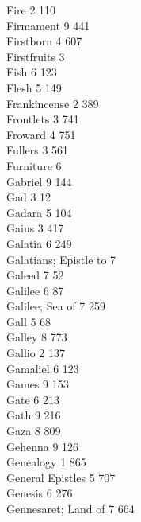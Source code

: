 Fire \hfill 2 \quad \phantom{0}110\\
Firmament \hfill 9 \quad \phantom{0}441\\
Firstborn \hfill 4 \quad \phantom{0}607\\
Firstfruits \hfill 3 \\
Fish \hfill 6 \quad \phantom{0}123\\
Flesh \hfill 5 \quad \phantom{0}149\\
Frankincense \hfill 2 \quad \phantom{0}389\\
Frontlets \hfill 3 \quad \phantom{0}741\\
Froward \hfill 4 \quad \phantom{0}751\\
Fullers \hfill 3 \quad \phantom{0}561\\
Furniture \hfill 6 \\
Gabriel \hfill 9 \quad \phantom{0}144\\
Gad \hfill 3 \quad \phantom{0}\phantom{0}12\\
Gadara \hfill 5 \quad \phantom{0}104\\
Gaius \hfill 3 \quad \phantom{0}417\\
Galatia \hfill 6 \quad \phantom{0}249\\
Galatians; Epistle to \hfill 7 \\
Galeed \hfill 7 \quad \phantom{0}\phantom{0}52\\
Galilee \hfill 6 \quad \phantom{0}\phantom{0}87\\
Galilee; Sea of \hfill 7 \quad \phantom{0}259\\
Gall \hfill 5 \quad \phantom{0}\phantom{0}68\\
Galley \hfill 8 \quad \phantom{0}773\\
Gallio \hfill 2 \quad \phantom{0}137\\
Gamaliel \hfill 6 \quad \phantom{0}123\\
Games \hfill 9 \quad \phantom{0}153\\
Gate \hfill 6 \quad \phantom{0}213\\
Gath \hfill 9 \quad \phantom{0}216\\
Gaza \hfill 8 \quad \phantom{0}809\\
Gehenna \hfill 9 \quad \phantom{0}126\\
Genealogy \hfill 1 \quad \phantom{0}865\\
General Epistles \hfill 5 \quad \phantom{0}707\\
Genesis \hfill 6 \quad \phantom{0}276\\
Gennesaret; Land of \hfill 7 \quad \phantom{0}664\\
